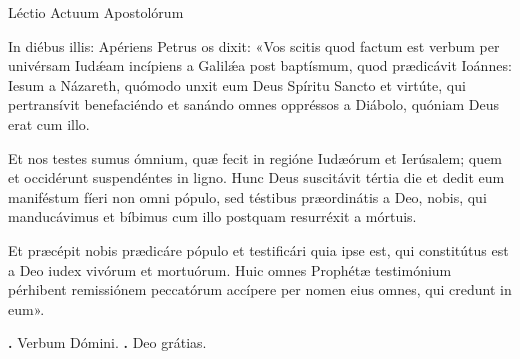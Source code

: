 
Léctio Actuum Apostolórum

In diébus illis: Apériens Petrus os dixit: «Vos scitis quod factum est verbum per univérsam Iud\'{\ae}am incípiens a Galil\'{\ae}a post baptísmum, quod prædicávit Ioánnes: Iesum a Názareth, quómodo unxit eum Deus Spíritu Sancto et virtúte, qui pertransívit benefaciéndo et sanándo omnes oppréssos a Diábolo, quóniam Deus erat cum illo.

Et nos testes sumus ómnium, quæ fecit in regióne Iudæórum et Ierúsalem; quem et occidérunt suspendéntes in ligno.
Hunc Deus suscitávit tértia die et dedit eum maniféstum fíeri non omni pópulo, sed téstibus præordinátis a Deo, nobis, qui manducávimus et bíbimus cum illo postquam resurréxit a mórtuis.

Et præcépit nobis prædicáre pópulo et testificári quia ipse est, qui constitútus est a Deo iudex vivórum et mortuórum.
Huic omnes Prophétæ testimónium pérhibent remissiónem peccatórum accípere per nomen eius omnes, qui credunt in eum».

\textbf{\Vbar.} Verbum Dómini.
\textbf{\Rbar.} Deo grátias.
\par